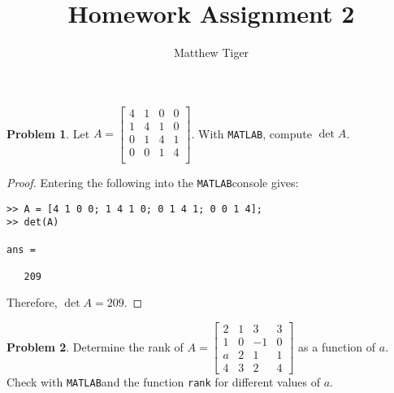 \documentclass[12pt]{article}
\title{Homework Assignment 2}
\author{Matthew Tiger}
\theoremstyle{definition}
\newtheorem{problem}{Problem}
\newcommand{\MAT}{\texttt{MATLAB}\hspace{1.25mm}}
\begin{document}
\maketitle


\begin{problem}
  Let $A = \begin{bmatrix} 4 & 1 & 0 & 0 \\ 1 & 4 & 1 & 0 \\ 0 & 1 & 4 & 1 \\ 0 & 0 & 1 & 4 \\\end{bmatrix}$. With \MAT, compute $\det A$.
\end{problem}

\begin{proof}
  Entering the following into the \MAT console gives:
  \begin{verbatim}>> A = [4 1 0 0; 1 4 1 0; 0 1 4 1; 0 0 1 4];
>> det(A)

ans =

   209\end{verbatim}
 Therefore, $\det A = 209.$
\end{proof}


\begin{problem}
  Determine the rank of $A = \begin{bmatrix} 2 & 1 & 3 & 3 \\ 1 & 0 & -1 & 0 \\ a & 2 & 1 & 1 \\ 4 & 3 & 2 & 4 \end{bmatrix}$ as a function of $a$.
  Check with \MAT and the function \texttt{rank} for different values of $a$.
\end{problem}
\end{document}
